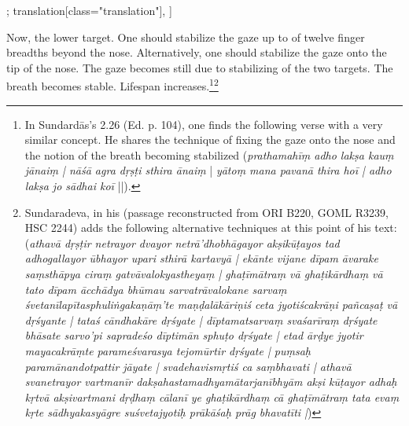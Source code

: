 \begin{alignment}[
  texts=edition[class="edition"];
  translation[class="translation"],
  ]
\begin{translation}
\begin{tlate}[p15_01]
      \noindent
\begin{euber}[f14_1]\end{euber}
    Now, the lower target. One should stabilize the gaze up to of twelve finger breadths beyond the nose. Alternatively, one should stabilize the gaze onto the tip of the nose. The gaze becomes still due to stabilizing of the two targets. The breath becomes stable. Lifespan increases.\footnote{In Sundardās's  2.26 (Ed. p. 104), one finds the following verse with a very similar concept. He shares the technique of fixing the gaze onto the nose and the notion of the breath becoming stabilized (\textit{prathamahīṃ adho lakṣa kauṃ jānaiṃ | nāśā agra dṛṣṭi sthira ānaiṃ} | \textit{yātoṃ mana pavanā thira hoī | adho lakṣa jo sādhai koī} ||).}\footnote{Sundaradeva, in his  (passage reconstructed from ORI B220, GOML R3239, HSC 2244) adds the following alternative techniques at this point of his text: (\textit{athavā dṛṣṭir netrayor dvayor netrā'dhobhāgayor akṣikūṭayos tad adhogallayor ūbhayor upari sthirā kartavyā | ekānte vijane dīpam āvarake saṃsthāpya ciraṃ gatvāvalokyastheyaṃ | ghaṭīmātraṃ vā ghaṭikārdhaṃ vā tato dīpam ācchādya bhūmau sarvatrāvalokane sarvaṃ śvetanīlapītasphuliṅgakaṇāṃ'te maṇḍalākāriṇiś ceta jyotiścakrāṇi pañcaṣaṭ vā dṛśyante | tataś cāndhakāre dṛśyate | dīptamatsarvaṃ svaśarīraṃ dṛśyate bhāsate sarvo'pi sapradeśo dīptimān sphuṭo dṛśyate | etad ārḍye jyotir mayacakrāṃte parameśvarasya tejomūrtir dṛśyate | puṃsaḥ paramānandotpattir jāyate | svadehavismṛtiś ca saṃbhavati | athavā svanetrayor vartmanīr dakṣahastamadhyamātarjanībhyām akṣi kūṭayor adhaḥ kṛtvā akṣivartmani dṛḍhaṃ cālanī ye ghaṭikārdhaṃ cā ghaṭīmātraṃ tata evaṃ kṛte sādhyakasyāgre suśvetajyotiḥ prākāśaḥ prāg bhavatīti |})}

\end{tlate}
\end{translation}
\end{alignment}
